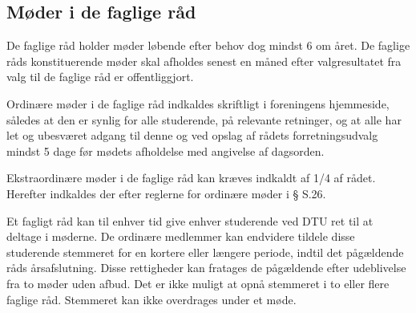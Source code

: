 \begin{list}
\subsection{Møder i de faglige råd}
\item De faglige råd holder møder løbende efter behov dog mindst 6 om året.
           De faglige råds konstituerende møder skal afholdes senest en måned efter valgresultatet fra valg til de faglige
             råd er offentliggjort.
\item  Ordinære møder i de faglige råd indkaldes skriftligt i foreningens hjemmeside, således at den er synlig for alle studerende, på relevante retninger, og at alle har let og ubesværet adgang til denne og ved opslag af rådets forretningsudvalg mindst 5 dage før mødets afholdelse med angivelse af dagsorden.
\item  Ekstraordinære møder i de faglige råd kan kræves indkaldt af 1/4 af rådet. Herefter indkaldes der efter
            reglerne for ordinære møder i § S.26.
\item  Et fagligt råd kan til enhver tid give enhver studerende ved DTU ret til at deltage i møderne. De ordinære
          medlemmer kan endvidere tildele disse studerende stemmeret for en kortere eller længere periode, indtil det
          pågældende råds årsafslutning. Disse rettigheder kan fratages de pågældende efter udeblivelse fra to møder
                uden afbud. Det er ikke muligt at opnå stemmeret i to eller flere faglige råd. Stemmeret kan ikke overdrages
                 under et møde.

\end{list}
